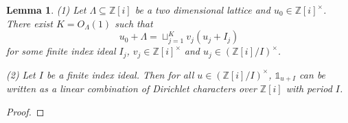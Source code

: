 \documentclass[11pt]{amsart}
\newtheorem{lemma}{Lemma}[section]
\theoremstyle{definition}
\newcommand{\Q}{{\mathbb Q}}
\newcommand{\Z}{{\mathbb Z}}
\begin{document}
\iffalse
\begin{lemma}\label{lc}
  (1) Let $\Lambda\subseteq \Z[i]$ be a two dimensional lattice and $u_{0}\in \Z[i]^{\times}$. There exist $K=O_{\Lambda}(1)$ such that 
    $$u_{0}+\Lambda=\sqcup_{j=1}^{K}v_{j}(u_{j}+I_{j})$$
    for some finite index ideal $I_{j}$, $v_{j}\in\Z[i]^{\times}$ and $u_{j}\in (\Z[i]/I)^{\times}$.
    
   (2) Let $I$ be a finite index ideal. Then for all $u\in (\Z[i]/I)^{\times}$, $\mathds{1}_{u+I}$ can be written as a linear combination of Dirichlet characters over $\Z[i]$ with period $I$.
\end{lemma}


\begin{proof}









\end{proof}
\end{document}

